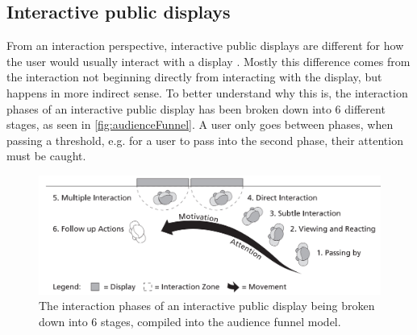 





\subsection{Interactive public displays} %
    From an interaction perspective, interactive public displays are different for how the user would usually interact with a display \cite{interactivePublicDisplays}. Mostly this difference comes from the interaction not beginning directly from interacting with the display, but happens in more indirect sense. To better understand why this is, the interaction phases of an interactive public display has been broken down into 6 different stages, as seen in \autoref{fig:audienceFunnel}. A user only goes between phases, when passing a threshold, e.g. for a user to pass into the second phase, their attention must be caught\cite{interactivePublicDisplays}.
    
    \begin{figure}[H]
    	\centering
    	\includegraphics[width=0.9\linewidth]{figure/Analysis/AudienceFunnel.png}
    	\caption{The interaction phases of an interactive public display being broken down into 6 stages, compiled into the audience funnel model\cite{interactivePublicDisplays}.}
    	\label{fig:audienceFunnel}
    \end{figure}
    
